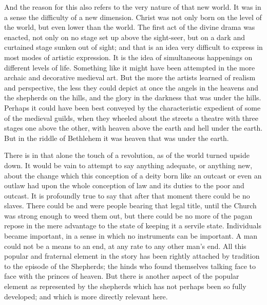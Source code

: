 And the reason for this also refers to the very nature of that new world. It was in a sense the difficulty of a new dimension. Christ was not only born on the level of the world, but even lower than the world. The first act of the divine drama was enacted, not only on no stage set up above the sight-seer, but on a dark and curtained stage sunken out of sight; and that is an idea very difficult to express in most modes of artistic expression. It is the idea of simultaneous happenings on different levels of life. Something like it might have been attempted in the more archaic and decorative medieval art. But the more the artists learned of realism and perspective, the less they could depict at once the angels in the heavens and the shepherds on the hills, and the glory in the darkness that was under the hills. Perhaps it could have been best conveyed by the characteristic expedient of some of the medieval guilds, when they wheeled about the streets a theatre with three stages one above the other, with heaven above the earth and hell under the earth. But in the riddle of Bethlehem it was heaven that was under the earth.

There is in that alone the touch of a revolution, as of the world turned upside down. It would be vain to attempt to say anything adequate, or anything new, about the change which this conception of a deity born like an outcast or even an outlaw had upon the whole conception of law and its duties to the poor and outcast. It is profoundly true to say that after that moment there could be no slaves. There could be and were people bearing that legal title, until the Church was strong enough to weed them out, but there could be no more of the pagan repose in the mere advantage to the state of keeping it a servile state. Individuals became important, in a sense in which no instruments can be important. A man could not be a means to an end, at any rate to any other man's end. All this popular and fraternal element in the story has been rightly attached by tradition to the episode of the Shepherds; the hinds who found themselves talking face to face with the princes of heaven. But there is another aspect of the popular element as represented by the shepherds which has not perhaps been so fully developed; and which is more directly relevant here.

